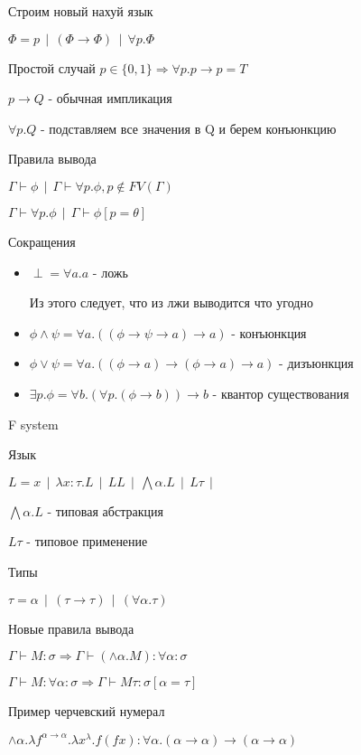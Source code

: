 
\begin{para}{Строим новый нахуй язык}

$\Phi = p \: \: | \: \: (\Phi \rightarrow \Phi) \: \: | \: \: \forall p.\Phi$

Простой случай $p \in \{0, 1\} \Rightarrow \forall p. p \rightarrow p = T$

$p \rightarrow Q$ - обычная импликация

$\forall p.Q$ - подставляем все значения в Q и берем конъюнкцию

Правила вывода

$\Gamma \vdash \phi \: \: | \: \: \Gamma \vdash \forall p.\phi, p \notin FV(\Gamma)$

$\Gamma \vdash \forall p.\phi \: \: | \: \: \Gamma \vdash \phi[p = \theta]$

Сокращения

\begin{itemize}

  \item $\perp = \forall a.a$ - ложь

Из этого следует, что из лжи выводится что угодно

  \item $\phi \wedge \psi = \forall a. ((\phi \rightarrow \psi \rightarrow a) \rightarrow a)$ - конъюнкция
  
  \item $\phi \vee \psi = \forall a. ((\phi \rightarrow a) \rightarrow (\phi \rightarrow a) \rightarrow a)$ - дизъюнкция
  
  \item $\exists p. \phi = \forall b. ( \forall p. (\phi \rightarrow b)) \rightarrow b$ - квантор существования

\end{itemize}

\end{para}



\begin{para}{F system}

Язык

$L = x \: \: | \: \: \lambda x : \tau. L \: \: | \: \: LL \: \: | \: \: \bigwedge \alpha. L \: \: | \: \: L \tau \: \: | \: \: $

$\bigwedge \alpha. L$ - типовая абстракция

$L \tau$ - типовое применение

Типы

$\tau  = \alpha \: \: | \: \: (\tau \rightarrow \tau) \: \: | \: \: ( \forall \alpha. \tau)$

Новые правила вывода

$\Gamma \vdash M : \sigma \Rightarrow \Gamma \vdash (\wedge \alpha. M) : \forall \alpha : \sigma$

$\Gamma \vdash M: \forall \alpha : \sigma \Rightarrow \Gamma \vdash M \tau : \sigma[\alpha = \tau]$

Пример черчевский нумерал

$\wedge \alpha. \lambda f^{\alpha \rightarrow \alpha}. \lambda x^\lambda.f(fx) : \forall \alpha . (\alpha \rightarrow \alpha) \rightarrow (\alpha \rightarrow \alpha)$

\end{para}